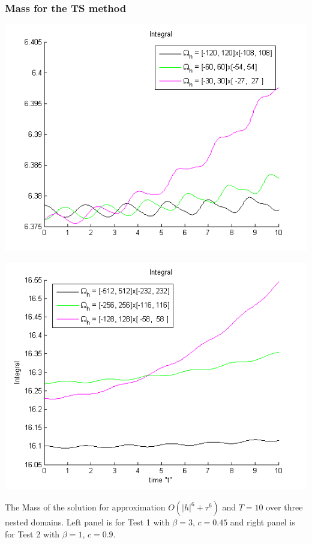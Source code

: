 \documentclass{beamer}
\begin{document}


\begin{frame}
\frametitle{Mass for the TS method}

\begin{center}\vspace{0.4cm}
	\begin{minipage}[b]{0.49\linewidth}
		\includegraphics[width=\linewidth]{../amitans/figures/MassTaylor_120_60_30_ZB1_bt3_c045_h020_O(h^6).png}
	\end{minipage}	
	\begin{minipage}[b]{0.49\linewidth}
		\includegraphics[width=\linewidth]{../amitans/figures/MassTaylor_512_256_128_ZB1_bt1_c090_h040_O(h^6).png}
		
	\end{minipage}
\end{center}
The Mass of the solution for approximation $O(|h|^6 + \tau^6)$ and $T = 10$ over three nested domains. Left panel is for Test 1 with $\beta=3$, $c = 0.45$ and right panel is for Test 2 with $\beta=1$, $c = 0.9$.
\end{frame}
\end{document}
